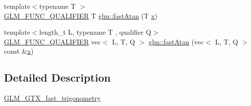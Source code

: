 \begin{DoxyCompactItemize}
\item 
{\footnotesize template$<$typename T $>$ }\\\mbox{\hyperlink{setup_8hpp_a33fdea6f91c5f834105f7415e2a64407}{G\+L\+M\+\_\+\+F\+U\+N\+C\+\_\+\+Q\+U\+A\+L\+I\+F\+I\+ER}} T \mbox{\hyperlink{group__gtx__fast__trigonometry_gae25de86a968490ff56856fa425ec9d30}{glm\+::fast\+Atan}} (T \mbox{\hyperlink{_s_d_l__opengl_8h_ad0e63d0edcdbd3d79554076bf309fd47}{x}})
\item 
{\footnotesize template$<$length\+\_\+t L, typename T , qualifier Q$>$ }\\\mbox{\hyperlink{setup_8hpp_a33fdea6f91c5f834105f7415e2a64407}{G\+L\+M\+\_\+\+F\+U\+N\+C\+\_\+\+Q\+U\+A\+L\+I\+F\+I\+ER}} vec$<$ L, T, Q $>$ \mbox{\hyperlink{namespaceglm_a3454e48a4d7550d56d91858645bf2928}{glm\+::fast\+Atan}} (vec$<$ L, T, Q $>$ const \&\mbox{\hyperlink{_s_d_l__opengl_8h_ad0e63d0edcdbd3d79554076bf309fd47}{x}})
\end{DoxyCompactItemize}


\subsection{Detailed Description}
\mbox{\hyperlink{group__gtx__fast__trigonometry}{G\+L\+M\+\_\+\+G\+T\+X\+\_\+fast\+\_\+trigonometry}} 